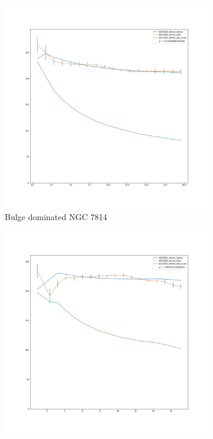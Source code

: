\documentclass[reprint,%
 amsmath,amssymb,
 aps,
]{revtex4-1}
\begin{document}
 \begin{figure}[ht] 
  \begin{subfigure}[b]{0.5\linewidth}
    \centering
    \includegraphics[width=0.95\linewidth]{figures/NGC7814_rotmod_XueSofue.png} 
    \caption{Bulge dominated NGC 7814} 
    \label{fig25:f} 
    \vspace{4ex}
  \end{subfigure}%
    \begin{subfigure}[c]{0.5\linewidth}
    \centering
    \includegraphics[width=0.95\linewidth]{figures/NGC0891_rotmod_XueSofue.png}

\end{subfigure}
\end{figure}
\end{document}

